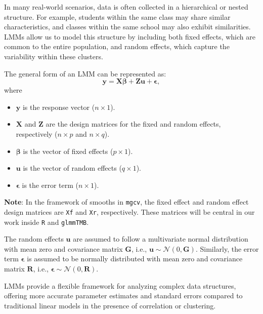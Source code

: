 \documentclass[12pt, twoside,hidelinks]{article}
\theoremstyle{definition}
\numberwithin{equation}{section}
\begin{document}
In many real-world scenarios, data is often collected in a hierarchical or
nested structure. For example, students within the same class may share
similar characteristics, and classes within the same school may also exhibit
similarities. LMMs allow us to model this structure by including both fixed
effects, which are common to the entire population, and random effects, which
capture the variability within these clusters.
\newline

The general form of an LMM can be represented as:
\begin{equation}
\mathbf{y} = \mathbf{X}\boldsymbol{\beta} + \mathbf{Z}\boldsymbol{u} + \boldsymbol{\epsilon},
\label{eq:lmm_general_form}
\end{equation}
where
\begin{itemize}
    \item $\mathbf{y}$ is the response vector ($n \times 1$).
    \item $\mathbf{X}$ and $\mathbf{Z}$ are the design matrices for the fixed and random effects, respectively ($n \times p$ and $n \times q$).
    \item $\boldsymbol{\beta}$ is the vector of fixed effects ($p \times 1$).
    \item $\boldsymbol{u}$ is the vector of random effects ($q \times 1$).
    \item $\boldsymbol{\epsilon}$ is the error term ($n \times 1$).
\end{itemize}

\textbf{Note}: In the framework of smooths in \texttt{mgcv}, the fixed effect and random effect design matrices are \texttt{Xf} and \texttt{Xr}, respectively. These matrices will be central in our work inside \texttt{R} and \texttt{glmmTMB}.
\newline

The random effects $\boldsymbol{u}$ are assumed to follow a multivariate normal distribution with mean zero and covariance matrix $\mathbf{G}$, i.e., $\boldsymbol{u} \sim \mathcal{N}(0, \mathbf{G})$. Similarly, the error term $\boldsymbol{\epsilon}$ is assumed to be normally distributed with mean zero and covariance matrix $\mathbf{R}$, i.e., $\boldsymbol{\epsilon} \sim \mathcal{N}(0, \mathbf{R})$.
\newline

LMMs provide a flexible framework for analyzing complex data structures, offering more accurate parameter estimates and standard errors compared to traditional linear models in the presence of correlation or clustering.
\end{document}
